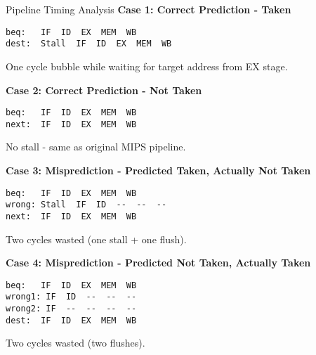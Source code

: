 \documentclass[aspectratio=169,12pt]{beamer}
\begin{document}
\begin{frame}[fragile]{Pipeline Timing Analysis}
\textbf{Case 1: Correct Prediction - Taken}
\begin{verbatim}
beq:   IF  ID  EX  MEM  WB
dest:  Stall  IF  ID  EX  MEM  WB
\end{verbatim}
One cycle bubble while waiting for target address from EX stage.

\textbf{Case 2: Correct Prediction - Not Taken}
\begin{verbatim}
beq:   IF  ID  EX  MEM  WB
next:  IF  ID  EX  MEM  WB
\end{verbatim}
No stall - same as original MIPS pipeline.

\textbf{Case 3: Misprediction - Predicted Taken, Actually Not Taken}
\begin{verbatim}
beq:   IF  ID  EX  MEM  WB
wrong: Stall  IF  ID  --  --  --
next:  IF  ID  EX  MEM  WB
\end{verbatim}
Two cycles wasted (one stall + one flush).

\textbf{Case 4: Misprediction - Predicted Not Taken, Actually Taken}
\begin{verbatim}
beq:   IF  ID  EX  MEM  WB
wrong1: IF  ID  --  --  --
wrong2: IF  --  --  --  --
dest:  IF  ID  EX  MEM  WB
\end{verbatim}
Two cycles wasted (two flushes).
\end{frame}
\end{document}
